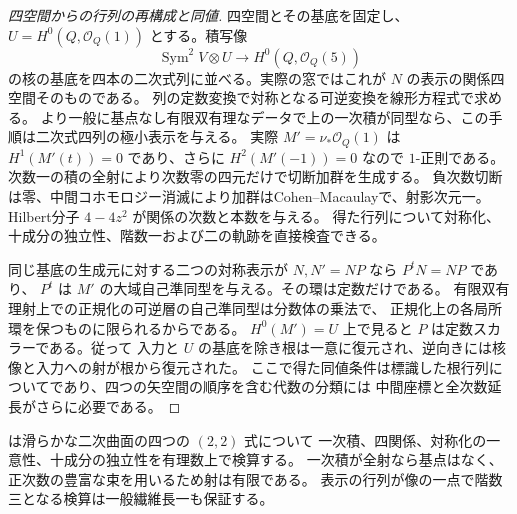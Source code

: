 \begin{proof}[四空間からの行列の再構成と同値]
四空間とその基底を固定し、$U=H^0(Q,\mathcal O_Q(1))$ とする。積写像
\[
  \operatorname{Sym}^2 V\otimes U\longrightarrow H^0(Q,\mathcal O_Q(5))
\]
の核の基底を四本の二次式列に並べる。実際の窓ではこれが $N$ の表示の関係四空間そのものである。
列の定数変換で対称となる可逆変換を線形方程式で求める。
より一般に基点なし有限双有理なデータで上の一次積が同型なら、この手順は二次式四列の極小表示を与える。
実際 $M'=\nu_*\mathcal O_Q(1)$ は $H^1(M'(t))=0$ であり、さらに $H^2(M'(-1))=0$ なので
$1$-正則である。次数一の積の全射により次数零の四元だけで切断加群を生成する。
負次数切断は零、中間コホモロジー消滅により加群はCohen--Macaulayで、射影次元一。
Hilbert分子 $4-4z^2$ が関係の次数と本数を与える。
得た行列について対称化、十成分の独立性、階数一および二の軌跡を直接検査できる。

同じ基底の生成元に対する二つの対称表示が $N,N'=NP$ なら $P^tN=NP$ であり、
$P^t$ は $M'$ の大域自己準同型を与える。その環は定数だけである。
有限双有理射上での正規化の可逆層の自己準同型は分数体の乗法で、
正規化上の各局所環を保つものに限られるからである。
$H^0(M')=U$ 上で見ると $P$ は定数スカラーである。従って
入力と $U$ の基底を除き根は一意に復元され、逆向きには核像と入力への射が根から復元された。
ここで得た同値条件は標識した根行列についてであり、四つの矢空間の順序を含む代数の分類には
中間座標と全次数延長がさらに必要である。
\end{proof}
 は滑らかな二次曲面の四つの $(2,2)$ 式について
一次積、四関係、対称化の一意性、十成分の独立性を有理数上で検算する。
一次積が全射なら基点はなく、正次数の豊富な束を用いるため射は有限である。
表示の行列が像の一点で階数三となる検算は一般繊維長一も保証する。
